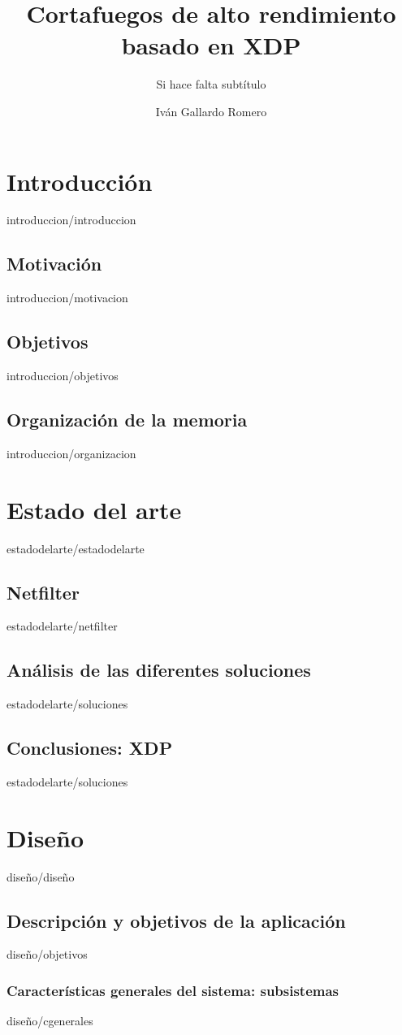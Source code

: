 \documentclass[epsbased,copyright,final,printable,covers,extendedindex,firstnumbered,tfg,gnuplot]{tfgtfmthesisuam}
\title{Cortafuegos de alto rendimiento basado en XDP}
\subtitle{Si hace falta subtítulo}
\author{Iván Gallardo Romero}
\begin{document}
\chapter{Introducción\label{CAP:INTRODUCCION}}{introduccion/introduccion}
 \section{Motivación\label{SEC:MOTIVACION}}{introduccion/motivacion}
 \section{Objetivos\label{SEC:OBJETIVOS}}{introduccion/objetivos}
 \section{Organización de la memoria\label{SEC:ORGANIZACION}}{introduccion/organizacion}
 
 
\chapter{Estado del arte\label{CAP:ESTADODELARTE}}{estadodelarte/estadodelarte}
    \section{Netfilter\label{SEC:NETFILTER}}{estadodelarte/netfilter}
    \section{Análisis de las diferentes soluciones\label{SEC:SOLUCIONES}}{estadodelarte/soluciones}
    \section{Conclusiones: XDP\label{SEC:CONCLUSIONESXDP}}{estadodelarte/soluciones}

\chapter{Diseño\label{CAP:DISEÑO}}{diseño/diseño}
    \section{Descripción y objetivos de la aplicación\label{SEC:DOBJETIVOS}}{diseño/objetivos}
        \subsection{Características generales del sistema: subsistemas\label{SEC:CGENERALES}}{diseño/cgenerales}
\end{document}
